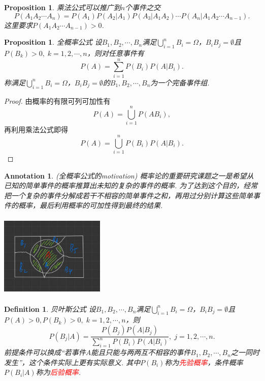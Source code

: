 \documentclass{article}
\newtheorem{proposition}[theorem]{Proposition}
\newtheorem{definition}[theorem]{Definition}
\newtheorem{annotation}[theorem]{Annotation}
\newcommand{\redt}[1]{\textcolor{red}{#1}}
\begin{document}
\begin{proposition}
\rm 乘法公式可以推广到$n$个事件之交
$$
P(A_1A_2\cdots A_n) = P(A_1)P(A_2|A_1)P(A_3|A_1A_2)\cdots P(A_n|A_1A_2\cdots A_{n-1}).
$$
这里要求$P(A_1A_2\cdots A_{n-1}) > 0$. 
\end{proposition}

\begin{proposition}
\rm {\color{red}全概率公式} 设$B_1,B_2,\cdots,B_n$满足$\bigcup\limits_{i=1}^n B_i = \Omega$，$B_iB_j = \emptyset$且$P(B_k) > 0,\; k=1,2,\cdots,n$，则对任意事件有
$$
P(A) = \sum\limits_{i=1}^n P(B_i)P(A|B_i).
$$
称满足$\bigcup\limits_{i=1}^n B_i = \Omega$，$B_iB_j = \emptyset$的$B_1,B_2,\cdots,B_n$为一个{\color{red}完备事件组}.
\end{proposition}

\begin{proof}
由概率的有限可列可加性有
$$
P(A) = \bigcup\limits_{i=1}^n P(AB_i),
$$
再利用乘法公式即得
$$
P(A) = \bigcup\limits_{i=1}^n P(B_i)P(A|B_i).
$$
\end{proof}

\begin{annotation}
\rm {\color{red}(全概率公式的motivation)} 概率论的重要研究课题之一是希望从已知的简单事件的概率推算出未知的复杂的事件的概率. 为了达到这个目的，经常把一个复杂的事件分解成若干不相容的简单事件之和，再用过分别计算这些简单事件的概率，最后利用概率的可加性得到最终的结果.

\begin{center}
\includegraphics[width=5cm, height=4cm]{images/total_probability.jpg}
\end{center}
\end{annotation}

\begin{definition}
\rm {\color{red}贝叶斯公式} 设$B_1,B_2,\cdots,B_n$满足$\bigcup\limits_{i=1}^n B_i = \Omega$，$B_iB_j = \emptyset$且$P(A)>0, P(B_k) > 0,\; k=1,2,\cdots,n$，则
	$$
		P(B_j | A) = \frac{P(B_j)P(A|B_j)}{\sum\limits_{i=1}^n P(B_i)P(A|B_i)},\; j = 1,2,\cdots,n.
	$$
前提条件可以换成“若事件$A$能且只能与两两互不相容的事件$B_1,B_2,\cdots,B_n$之一同时发生”，这个条件实际上更有实际意义. 其中$P(B_i)$称为\redt{先验概率}，条件概率$P(B_i | A)$称为\redt{后验概率}. 
\end{definition}
\end{document}
